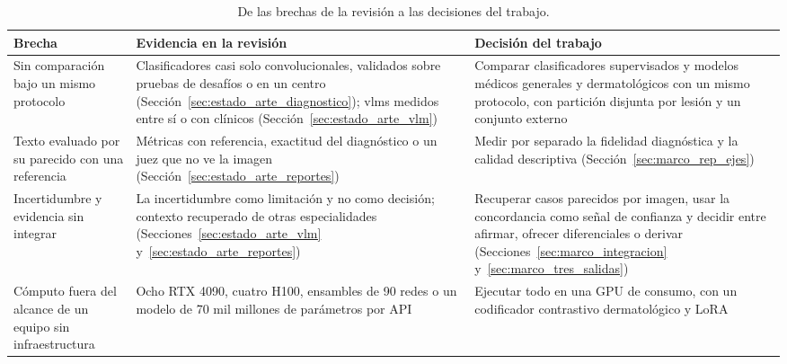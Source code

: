 \begin{table}[!t]
    \centering
    \caption{De las brechas de la revisión a las decisiones del trabajo.}
    \label{tab:marco_brechas}
    \small
    \begin{tabularx}{\textwidth}{@{}>{\raggedright\arraybackslash}p{3.3cm}
        >{\raggedright\arraybackslash\hspace{0pt}}X >{\raggedright\arraybackslash\hspace{0pt}}X@{}}
        \toprule
        \textbf{Brecha} & \textbf{Evidencia en la revisión} & \textbf{Decisión del trabajo} \\
        \midrule
        Sin comparación bajo un mismo protocolo
            & Clasificadores casi solo convolucionales, validados sobre pruebas de desafíos o en un centro
              (Sección~\ref{sec:estado_arte_diagnostico}); \glspl{vlm} medidos entre sí o con clínicos
              (Sección~\ref{sec:estado_arte_vlm})
            & Comparar clasificadores supervisados y modelos médicos generales y dermatológicos con un mismo
              protocolo, con partición disjunta por lesión y un conjunto externo \\
        \filasep
        Texto evaluado por su parecido con una referencia
            & Métricas con referencia, exactitud del diagnóstico o un juez que no ve la imagen
              (Sección~\ref{sec:estado_arte_reportes})
            & Medir por separado la fidelidad diagnóstica y la calidad descriptiva
              (Sección~\ref{sec:marco_rep_ejes}) \\
        \filasep
        Incertidumbre y evidencia sin integrar
            & La incertidumbre como limitación y no como decisión; contexto recuperado de otras especialidades
              (Secciones~\ref{sec:estado_arte_vlm} y~\ref{sec:estado_arte_reportes})
            & Recuperar casos parecidos por imagen, usar la concordancia como señal de confianza y decidir entre
              afirmar, ofrecer diferenciales o derivar
              (Secciones~\ref{sec:marco_integracion} y~\ref{sec:marco_tres_salidas}) \\
        \filasep
        Cómputo fuera del alcance de un equipo sin infraestructura
            & Ocho RTX 4090, cuatro H100, ensambles de 90 redes o un modelo de 70 mil millones de parámetros
              por API
            & Ejecutar todo en una GPU de consumo, con un codificador contrastivo dermatológico y LoRA \\
        \bottomrule
    \end{tabularx}
\end{table}

